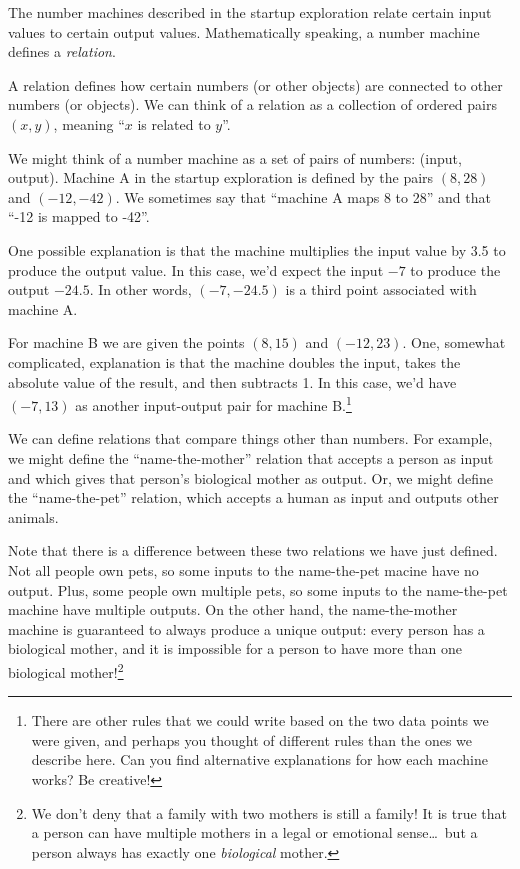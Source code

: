 The number machines described in the startup exploration relate certain input values to certain output values. Mathematically speaking, a number machine defines a \textit{relation}.

\begin{boxdef}[Relation]
A \gls{relation} defines how certain numbers (or other objects) are connected to other numbers (or objects). We can think of a relation as a collection of ordered pairs $(x,y)$, meaning ``$x$ is related to $y$''.
\end{boxdef}

We might think of a number machine as a set of pairs of numbers: (input, output). Machine A in the startup exploration is defined by the pairs $(8, 28)$ and $(-12, -42)$. We sometimes say that ``machine A maps 8 to 28'' and that ``-12 is mapped to -42''.

One possible explanation is that the machine multiplies the input value by 3.5 to produce the output value. In this case, we'd expect the input $-7$ to produce the output $-24.5$. In other words, $(-7, -24.5)$ is a third point associated with machine A.

For machine B we are given the points $(8, 15)$ and $(-12, 23)$. One, somewhat complicated, explanation is that the machine doubles the input, takes the absolute value of the result, and then subtracts 1. In this case, we'd have $(-7, 13)$ as another input-output pair for machine B.\footnote{There are other rules that we could write based on the two data points we were given, and perhaps you thought of different rules than the ones we describe here. Can you find alternative explanations for how each machine works? Be creative!}

We can define relations that compare things other than numbers. For example, we might define the ``name-the-mother'' relation that accepts a person as input and which gives that person's biological mother as output. Or, we might define the ``name-the-pet'' relation, which accepts a human as input and outputs other animals.

Note that there is a difference between these two relations we have just defined. Not all people own pets, so some inputs to the name-the-pet macine have no output. Plus, some people own multiple pets, so some inputs to the name-the-pet machine have multiple outputs. On the other hand, the name-the-mother machine is guaranteed to always produce a unique output: every person has a biological mother, and it is impossible for a person to have more than one biological mother!\footnote{We don't deny that a family with two mothers is still a family! It is true that a person can have multiple mothers in a legal or emotional sense\ldots\ but a person always has exactly one \textit{biological} mother.}

